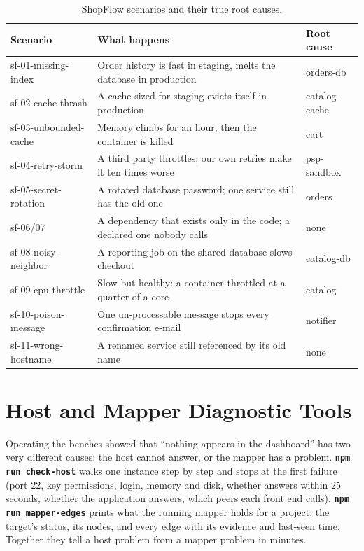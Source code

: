 \begin{table}[!htbp]
\centering
\caption{ShopFlow scenarios and their true root causes.}
\label{tab:scen-sf}
\footnotesize
\renewcommand{\arraystretch}{1.15}
\begin{tabularx}{\textwidth}{>{\raggedright\arraybackslash}p{3.3cm}>{\raggedright\arraybackslash}X>{\raggedright\arraybackslash}p{2.4cm}}
\toprule
\textbf{Scenario} & \textbf{What happens} & \textbf{Root cause}\\
\midrule
sf-01-missing-index & Order history is fast in staging, melts the database in production & orders-db\\
sf-02-cache-thrash & A cache sized for staging evicts itself in production & catalog-cache\\
sf-03-unbounded-cache & Memory climbs for an hour, then the container is killed & cart\\
sf-04-retry-storm & A third party throttles; our own retries make it ten times worse & psp-sandbox\\
sf-05-secret-rotation & A rotated database password; one service still has the old one & orders\\
sf-06/07 & A dependency that exists only in the code; a declared one nobody calls & none\\
sf-08-noisy-neighbor & A reporting job on the shared database slows checkout & catalog-db\\
sf-09-cpu-throttle & Slow but healthy: a container throttled at a quarter of a core & catalog\\
sf-10-poison-message & One un-processable message stops every confirmation e-mail & notifier\\
sf-11-wrong-hostname & A renamed service still referenced by its old name & none\\
\bottomrule
\end{tabularx}
\end{table}

\section{Host and Mapper Diagnostic Tools}
\label{sec:tools}
Operating the benches showed that ``nothing appears in the dashboard'' has two very different causes: the host cannot answer, or the mapper has a problem. \textbf{\texttt{npm run check-host}} walks one instance step by step and stops at the first failure (port 22, key permissions, login, memory and disk, whether  answers within 25 seconds, whether the application answers, which peers each front end calls). \textbf{\texttt{npm run mapper-edges}} prints what the running mapper holds for a project: the target's status, its nodes, and every edge with its evidence and last-seen time. Together they tell a host problem from a mapper problem in minutes.

